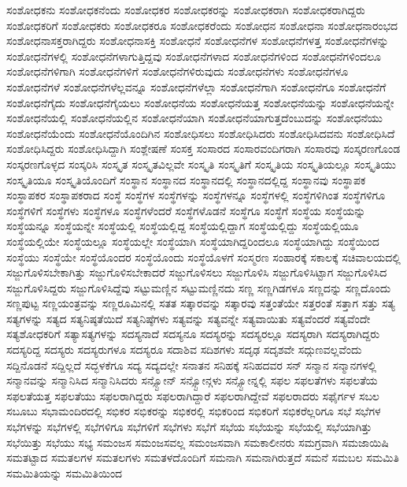 {ಸಂಶೋಧಕನು
ಸಂಶೋಧಕನೆಂದು
ಸಂಶೋಧಕರ
ಸಂಶೋಧಕರನ್ನು
ಸಂಶೋಧಕರಾಗಿ
ಸಂಶೋಧಕರಾಗಿದ್ದರು
ಸಂಶೋಧಕರಿಗೆ
ಸಂಶೋಧಕರು
ಸಂಶೋಧಕರೂ
ಸಂಶೋಧಕರೆಂದು
ಸಂಶೋಧನ
ಸಂಶೋಧನಾ
ಸಂಶೋಧನಾರಂಭದ
ಸಂಶೋಧನಾಸಕ್ತರಾಗಿದ್ದರು
ಸಂಶೋಧನಾಸಕ್ತಿ
ಸಂಶೋಧನೆ
ಸಂಶೋಧನೆಗಳ
ಸಂಶೋಧನೆಗಳತ್ತ
ಸಂಶೋಧನೆಗಳನ್ನು
ಸಂಶೋಧನೆಗಳಲ್ಲಿ
ಸಂಶೋಧನೆಗಳಾಗುತ್ತಿದ್ದವು
ಸಂಶೋಧನೆಗಳಾದ
ಸಂಶೋಧನೆಗಳಿಂದ
ಸಂಶೋಧನೆಗಳಿಂದಲೂ
ಸಂಶೋಧನೆಗಳಿಗಾಗಿ
ಸಂಶೋಧನೆಗಳಿಗೆ
ಸಂಶೋಧನೆಗಳಿರುವುದು
ಸಂಶೋಧನೆಗಳು
ಸಂಶೋಧನೆಗಳೂ
ಸಂಶೋಧನೆಗಳೆ
ಸಂಶೋಧನೆಗಳೆಲ್ಲವನ್ನೂ
ಸಂಶೋಧನೆಗಳೆಲ್ಲಾ
ಸಂಶೋಧನೆಗಾಗಿ
ಸಂಶೋಧನೆಗೂ
ಸಂಶೋಧನೆಗೆ
ಸಂಶೋಧನೆಗೈದು
ಸಂಶೋಧನೆಗೈಯಲು
ಸಂಶೋಧನೆಯ
ಸಂಶೋಧನೆಯತ್ತ
ಸಂಶೋಧನೆಯನ್ನು
ಸಂಶೋಧನೆಯನ್ನೇ
ಸಂಶೋಧನೆಯಲ್ಲಿ
ಸಂಶೋಧನೆಯಲ್ಲಿನ
ಸಂಶೋಧನೆಯಾಗಿ
ಸಂಶೋಧನೆಯಾಗುತ್ತದೆಂಬುದನ್ನು
ಸಂಶೋಧನೆಯು
ಸಂಶೋಧನೆಯೆಂದು
ಸಂಶೋಧನೆಯೊಂದಿಗಿನ
ಸಂಶೋಧಿಸಲು
ಸಂಶೋಧಿಸಿದರು
ಸಂಶೋಧಿಸಿದವನು
ಸಂಶೋಧಿಸಿದೆ
ಸಂಶೋಧಿಸಿದ್ದರು
ಸಂಶೋಧಿಸಿದ್ದಾಗಿ
ಸಂಶ್ಲೇಷಣೆ
ಸಂಸಕ್ತ
ಸಂಸಾರದ
ಸಂಸಾರವಂದಿಗರಾಗಿ
ಸಂಸಾರವು
ಸಂಸ್ಕರಣಗೊಂಡ
ಸಂಸ್ಕರಣಗೊಳ್ಳದ
ಸಂಸ್ಕರಿಸಿ
ಸಂಸ್ಕೃತ
ಸಂಸ್ಕೃತವಿಲ್ಲವೇ
ಸಂಸ್ಕೃತಿ
ಸಂಸ್ಕೃತಿಗೆ
ಸಂಸ್ಕೃತಿಯ
ಸಂಸ್ಕೃತಿಯಲ್ಲೂ
ಸಂಸ್ಕೃತಿಯು
ಸಂಸ್ಕೃತಿಯೂ
ಸಂಸ್ಕೃತಿಯೊಂದಿಗೆ
ಸಂಸ್ಥಾನ
ಸಂಸ್ಥಾನದ
ಸಂಸ್ಥಾನದಲ್ಲಿ
ಸಂಸ್ಥಾನದಲ್ಲಿದ್ದ
ಸಂಸ್ಥಾನವು
ಸಂಸ್ಥಾಪಕ
ಸಂಸ್ಥಾಪಕರ
ಸಂಸ್ಥಾಪಕರಾದ
ಸಂಸ್ಥೆ
ಸಂಸ್ಥೆಗಳ
ಸಂಸ್ಥೆಗಳನ್ನು
ಸಂಸ್ಥೆಗಳನ್ನೂ
ಸಂಸ್ಥೆಗಳಲ್ಲಿ
ಸಂಸ್ಥೆಗಳಿಗಿಂತ
ಸಂಸ್ಥೆಗಳಿಗೂ
ಸಂಸ್ಥೆಗಳಿಗೆ
ಸಂಸ್ಥೆಗಳು
ಸಂಸ್ಥೆಗಳೂ
ಸಂಸ್ಥೆಗಳೆಂದರೆ
ಸಂಸ್ಥೆಗಳೊಡನೆ
ಸಂಸ್ಥೆಗೂ
ಸಂಸ್ಥೆಗೆ
ಸಂಸ್ಥೆಯ
ಸಂಸ್ಥೆಯನ್ನು
ಸಂಸ್ಥೆಯನ್ನೂ
ಸಂಸ್ಥೆಯನ್ನೇ
ಸಂಸ್ಥೆಯಲ್ಲಿ
ಸಂಸ್ಥೆಯಲ್ಲಿದ್ದ
ಸಂಸ್ಥೆಯಲ್ಲಿದ್ದಾಗ
ಸಂಸ್ಥೆಯಲ್ಲಿದ್ದು
ಸಂಸ್ಥೆಯಲ್ಲಿಯೂ
ಸಂಸ್ಥೆಯಲ್ಲಿಯೇ
ಸಂಸ್ಥೆಯಲ್ಲೂ
ಸಂಸ್ಥೆಯಲ್ಲೇ
ಸಂಸ್ಥೆಯಾಗಿ
ಸಂಸ್ಥೆಯಾಗಿದ್ದರಿಂದಲೂ
ಸಂಸ್ಥೆಯಾಗಿದ್ದು
ಸಂಸ್ಥೆಯಿಂದ
ಸಂಸ್ಥೆಯು
ಸಂಸ್ಥೆಯೇ
ಸಂಸ್ಥೆಯೊಂದರ
ಸಂಸ್ಥೆಯೊಂದು
ಸಂಸ್ಥೆಯೊಳಗೆ
ಸಂಸ್ಮರಣ
ಸಂಹಾರಕ್ಕೆ
ಸಕಾಲಕ್ಕೆ
ಸಚಿವಾಲಯದಲ್ಲಿ
ಸಜ್ಜುಗೊಳಿಸಬೇಕಾಗಿತ್ತು
ಸಜ್ಜುಗೊಳಿಸಬೇಕಾದರೆ
ಸಜ್ಜುಗೊಳಿಸಲು
ಸಜ್ಜುಗೊಳಿಸಿ
ಸಜ್ಜುಗೊಳಿಸಿಟ್ಟಾಗ
ಸಜ್ಜುಗೊಳಿಸಿದ
ಸಜ್ಜುಗೊಳಿಸಿದ್ದರು
ಸಜ್ಜುಗೊಳಿಸಿದ್ದೆವು
ಸಟ್ಟುಮಣ್ಣಿನ
ಸಟ್ಟುಮಣ್ಣಿನದು
ಸಣ್ಣ
ಸಣ್ಣಗಿಡಗಳೂ
ಸಣ್ಣದನ್ನು
ಸಣ್ಣದೊಂದು
ಸಣ್ಣಪುಟ್ಟ
ಸಣ್ಣಯಂತ್ರವನ್ನು
ಸಣ್ಣರೂಮಿನಲ್ಲಿ
ಸತತ
ಸತ್ಕಾರವನ್ನು
ಸತ್ಕಾರವು
ಸತ್ತಂತೆಯೇ
ಸತ್ತರಂತೆ
ಸತ್ತಾಗ
ಸತ್ತು
ಸತ್ಯ
ಸತ್ಯಗಳನ್ನು
ಸತ್ಯದ
ಸತ್ಯನಿಷ್ಠತೆಯಿದೆ
ಸತ್ಯನಿಷ್ಠೆಗಳು
ಸತ್ಯವನ್ನು
ಸತ್ಯವನ್ನೇ
ಸತ್ಯವಾಯಿತು
ಸತ್ಯವೆಂದರೆ
ಸತ್ಯವೆಂದೇ
ಸತ್ಯಶೋಧಕರಿಗೆ
ಸತ್ಯಾಸತ್ಯಗಳನ್ನು
ಸದಸ್ಯನಾದೆ
ಸದಸ್ಯನೂ
ಸದಸ್ಯರನ್ನು
ಸದಸ್ಯರಲ್ಲೂ
ಸದಸ್ಯರಾಗಿ
ಸದಸ್ಯರಾಗಿದ್ದರು
ಸದಸ್ಯರಿದ್ದ
ಸದಸ್ಯರು
ಸದಸ್ಯರುಗಳೂ
ಸದಸ್ಯರೂ
ಸದಾಶಿವ
ಸದಿಶಗಳು
ಸದೃಢ
ಸದೃಶವೇ
ಸದ್ಗುಣವಲ್ಲವೆಂದು
ಸದ್ದಿನೊಡನೆ
ಸದ್ದಿಲ್ಲದೆ
ಸದ್ಭಳಕೆಗೂ
ಸದ್ಯ
ಸದ್ಯದಲ್ಲೇ
ಸನಾತನ
ಸನಿಹಕ್ಕೆ
ಸನಿಹದವರ
ಸನ್
ಸನ್ಮಾನ
ಸನ್ಮಾನಗಳಲ್ಲಿ
ಸನ್ಮಾನವನ್ನು
ಸನ್ಮಾನಿಸಿದ
ಸನ್ಮಾನಿಸಿದರು
ಸನ್ಸ್ಟೋನ್
ಸನ್ಸ್ಟೋನ್ಗಳು
ಸನ್ಸ್ಟೋನ್ನಲ್ಲಿ
ಸಫಲ
ಸಫಲತೆಗಳು
ಸಫಲತೆಯ
ಸಫಲತೆಯತ್ತ
ಸಫಲತೆಯು
ಸಫಲರಾಗಿದ್ದರು
ಸಫಲರಾಗಿದ್ದಾರೆ
ಸಫಲರಾಗಿದ್ದೇವೆ
ಸಫಲರಾದರು
ಸಫೈರ್ಗಳ
ಸಬಲ
ಸಬೂಬು
ಸಭಾಮಂದಿರದಲ್ಲಿ
ಸಭಿಕರ
ಸಭಿಕರನ್ನು
ಸಭಿಕರಲ್ಲಿ
ಸಭಿಕರಿಂದ
ಸಭಿಕರಿಗೆ
ಸಭಿಕರೆಲ್ಲರಿಗೂ
ಸಭೆ
ಸಭೆಗಳ
ಸಭೆಗಳನ್ನು
ಸಭೆಗಳಲ್ಲಿ
ಸಭೆಗಳಿಗೂ
ಸಭೆಗಳಿಗೆ
ಸಭೆಗಳು
ಸಭೆಗೆ
ಸಭೆಯ
ಸಭೆಯನ್ನು
ಸಭೆಯಲ್ಲಿ
ಸಭೆಯಾಗಿತ್ತು
ಸಭೆಯಿತ್ತು
ಸಭೆಯು
ಸಭ್ಯ
ಸಮಂಜಸ
ಸಮಂಜಸವಲ್ಲ
ಸಮಂಜಸವಾಗಿ
ಸಮಕಾಲೀನರು
ಸಮಗ್ರವಾಗಿ
ಸಮಜಾಯಿಷಿ
ಸಮತಟ್ಟಾದ
ಸಮತಲಗಳ
ಸಮತಲಗಳು
ಸಮತಳದೊಂದಿಗೆ
ಸಮನಾಗಿ
ಸಮನಾಗಿರುತ್ತದೆ
ಸಮನೆ
ಸಮಬಲ
ಸಮಮಿತಿ
ಸಮಮಿತಿಯನ್ನು
ಸಮಮಿತಿಯಿಂದ
}

